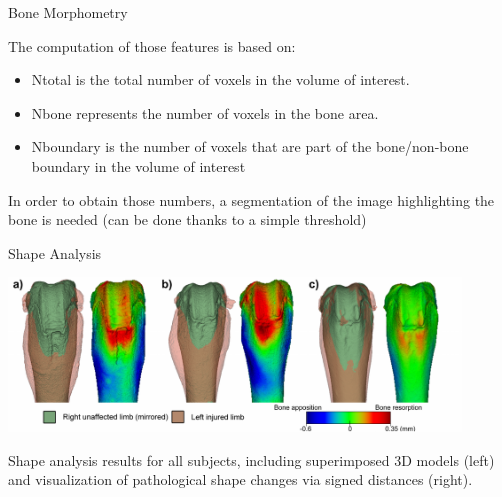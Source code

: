 \documentclass[10pt,aspectratio=169]{beamer}
\begin{document}
\begin{frame}{Bone Morphometry}
{    The computation of those features is based on:
    \begin{itemize}
      \item Ntotal is the total number of voxels in the volume of interest.
      \item Nbone represents the number of voxels in the bone area.
      \item Nboundary is the number of voxels that are part of the bone/non-bone boundary in the volume of interest
    \end{itemize}
    In order to obtain those numbers, a segmentation of the image highlighting the bone is needed (can be done thanks to a simple threshold)
  }
\end{frame}

\begin{frame}{Shape Analysis}
  \begin{center}
  \includegraphics[width=0.9\textwidth]{./figures/analysis_shape.png}\\
  \end{center}
  \vspace{0.1cm}
  \centering
  Shape analysis results for all subjects, including superimposed 3D models (left) and visualization of pathological shape changes via signed distances (right).
\end{frame}
\end{document}
